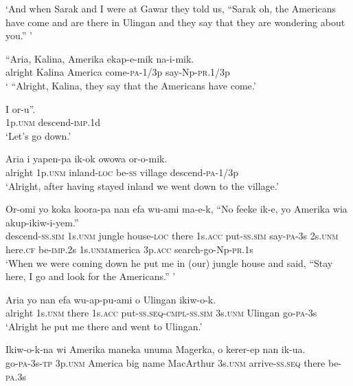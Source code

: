 \glt ‘And when Sarak and I were at Gawar they told us, “Sarak oh, the Americans have come and are there in Ulingan and they say that they are wondering about you.” ’ \\
\z


\ea
\gll  “Aria,  Kalina,  Amerika  ekap-e-mik  na-i-mik. \\
alright  Kalina  America  come-\textsc{pa}-1/3p  say-Np-\textsc{pr}.1/3p \\
\glt ‘ “Alright, Kalina, they say that the Americans have come.’ \\
\z


\ea
\gll  I  or-u”. \\
1p.\textsc{unm}  descend-\textsc{imp}.1d \\
\glt ‘Let’s go down.’ \\
\z


\ea
\gll  Aria  i  yapen-pa  ik-ok  owowa  or-o-mik. \\
alright  1p.\textsc{unm}  inland-\textsc{loc}  be-\textsc{ss}  village  descend-\textsc{pa}-1/3p \\
\glt ‘Alright, after having stayed inland we went down to the village.’ \\
\z


\ea
\gll  Or-omi  yo  koka  koora-pa  nan  efa               wu-ami  ma-e-k,  “No  feeke  ik-e,  yo  Amerika                   wia  akup-ikiw-i-yem.” \\
descend-\textsc{ss}.\textsc{sim}  1s.\textsc{unm}  jungle  house-\textsc{loc}  there  1s.\textsc{acc} put-\textsc{ss}.\textsc{sim}  say-\textsc{pa}-3s  2s.\textsc{unm}  here.\textsc{cf}  be-\textsc{imp}.2s  1s.\textsc{unma}merica  3p.\textsc{acc}  search-go-Np-\textsc{pr}.1s \\




\glt ‘When we were coming down he put me in (our) jungle house and said, “Stay here, I go and look for the Americans.” ’ \\
\z


\ea
\gll  Aria  yo  nan  efa  wu-ap-pu-ami                  o  Ulingan  ikiw-o-k. \\
alright  1s.\textsc{unm}  there  1s.\textsc{acc}  put-\textsc{ss.seq}-\textsc{cmpl}-\textsc{ss}.\textsc{sim}  3s.\textsc{unm}  Ulingan  go-\textsc{pa}-3s \\


\glt ‘Alright he put me there and went to Ulingan.’ \\
\z


\ea
\gll  Ikiw-o-k-na  wi  Amerika  maneka  unuma  Magerka,  o  kerer-ep  nan  ik-ua. \\
go-\textsc{pa}-3s-\textsc{tp}  3p.\textsc{unm}  America  big  name  MacArthur       3s.\textsc{unm}  arrive-\textsc{ss.seq}  there  be-\textsc{pa}.3s \\


